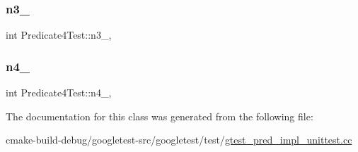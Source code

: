 \subsubsection{\texorpdfstring{n3\_}{n3\_}}
{\footnotesize\ttfamily int Predicate4\+Test\+::n3\+\_\+\hspace{0.3cm}{\ttfamily [static]}, {\ttfamily [protected]}}

\mbox{\label{classPredicate4Test_ae42e23ce11e3f1c6b813496d6180cc67}} 
\subsubsection{\texorpdfstring{n4\_}{n4\_}}
{\footnotesize\ttfamily int Predicate4\+Test\+::n4\+\_\+\hspace{0.3cm}{\ttfamily [static]}, {\ttfamily [protected]}}



The documentation for this class was generated from the following file\+:\begin{DoxyCompactItemize}
\item 
cmake-\/build-\/debug/googletest-\/src/googletest/test/\mbox{\hyperlink{gtest__pred__impl__unittest_8cc}{gtest\+\_\+pred\+\_\+impl\+\_\+unittest.\+cc}}\end{DoxyCompactItemize}
